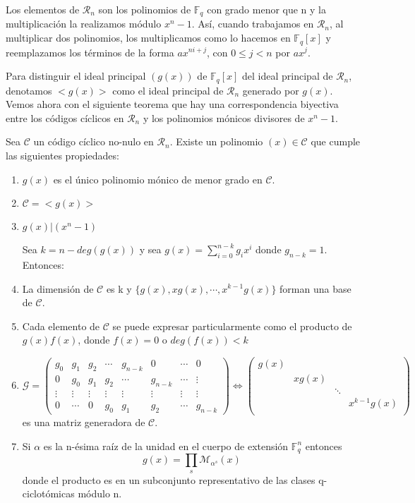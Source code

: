 Los elementos de $\mathcal{R}_n$ son los polinomios de $\mathbb{F}_q$ con grado menor que n y la multiplicación la realizamos módulo $x^n-1$. Así, cuando trabajamos en $\mathcal{R}_n$, al multiplicar dos polinomios, los multiplicamos como lo hacemos en $\mathbb{F}_q[x]$ y reemplazamos los términos de la forma $ax^{ni+j}$, con $ 0 \leq j < n$ por $ax^j$.

Para distinguir el ideal principal $(g(x))$ de $\mathbb{F}_q[x]$ del ideal principal de $\mathcal{R}_n$, denotamos $<g(x)>$ como el ideal principal de $\mathcal{R}_n$ generado por $g(x)$. Vemos ahora con el siguiente teorema que hay una correspondencia biyectiva entre los códigos cíclicos en $\mathcal{R}_n$ y los polinomios mónicos divisores de $x^n-1$.


\begin{theorem}
\label{th:base_ciclicos}
Sea $\mathcal{C} $ un código cíclico no-nulo en $\mathcal{R}_n$. Existe un polinomio $(x) \in \mathcal{C}$ que cumple las siguientes propiedades:
\begin{enumerate}
	\item $g(x)$ es el único polinomio mónico de menor grado en $\mathcal{C}$.
	\item $\mathcal{C} = <g(x)>$
	\item $g(x) | (x^n-1)$
	
	Sea $k = n - deg(g(x))$ y sea $g(x) = \sum_{i=0}^{n-k}g_ix^i$ donde $g_{n-k} = 1$. Entonces:
	\item La dimensión de $\mathcal{C}$ es k y $\{g(x),xg(x),\cdots,x^{k-1}g(x)\}$ forman una base de $\mathcal{C}$.
	\item Cada elemento de $\mathcal{C}$ se puede expresar particularmente como el producto de $g(x)f(x)$, donde $f(x) = 0$ o $deg(f(x)) < k$
	\item 	
	
	$\mathcal{G} = \begin{pmatrix}
			g_0 & g_1 & g_2 & \cdots & g_{n-k} & 0 & \cdots & 0 \\
			0 & g_0 & g_1 & g_2 & \cdots & g_{n-k} & \cdots & \vdots \\
			\vdots & \vdots & \vdots & \vdots & \vdots &\vdots & \vdots & \vdots \\
			0 & \cdots & 0 & g_0 & g_1 & g_2 & \cdots & g_{n-k} 
	\end{pmatrix} \Leftrightarrow \begin{pmatrix}
			g(x) &  &  &   \\
			 & xg(x)  &  &   \\
			 &  & \ddots &   \\
			 &  &  & x^{k-1}g(x)  \\
	\end{pmatrix}$ 
	es una matriz generadora de $\mathcal{C}$.
	\item Si $\alpha$ es la n-ésima raíz de la unidad en el cuerpo de extensión $\mathbb{F}_q^n$ entonces \[ 
	g(x) = \prod_s \mathcal{M}_{\alpha^s} (x)
	\]
	donde el producto es en un subconjunto representativo de las clases q-ciclotómicas módulo n.	
\end{enumerate}
\end{theorem}

